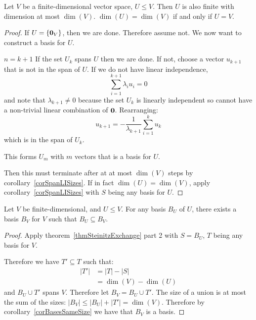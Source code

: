\documentclass[../Main.tex]{subfiles}
\begin{document}
\begin{corollary}
    Let $V$ be a finite-dimensional vector space, $U \leq V$. Then $U$ is also finite with dimension at most $\dim(V)$. $\dim(U) = \dim(V)$ if and only if $U = V$.
    \label{corSubspaceDim}
\end{corollary}
\begin{proof}
    If $U = \{\boldsymbol{0}_V\}$, then we are done. Therefore assume not. We now want to construct a basis for $U$.

    {$n = k + 1$}{
        If the set $U_k$ spans $U$ then we are done. If not, choose a vector $u_{k+1}$ that is not in the span of $U$. If we do not have linear independence,
        \begin{equation*}
            \sum_{i = 1}^{k+1} \lambda_iu_{i} = 0
        \end{equation*}
        and note that $\lambda_{k+1} \neq 0$ because the set $U_k$ is linearly independent so cannot have a non-trivial linear combination of $\boldsymbol{0}$.
        Rearranging:
        \begin{equation*}
            u_{k + 1} = -\frac{1}{\lambda_{k+1}} \sum_{i=1}^{k} u_k
        \end{equation*}
        which is in the span of $U_k$.~\contradiction
    }

    This forms $U_m$ with $m$ vectors that is a basis for $U$.

    Then this must terminate after at at most $\dim(V)$ steps by corollary~\ref{corSpanLISizes}. If in fact $\dim(U) = \dim(V)$, apply corollary~\ref{corSpanLISizes} with $S$ being any basis for $U$.
\end{proof}
\begin{proposition}
    Let $V$ be finite-dimensional, and $U \leq V$. For any basis $B_U$ of $U$, there exists a basis $B_V$ for $V$ such that $B_U \subseteq B_V$.
    \label{propBasisExtension}
\end{proposition}
\begin{proof}
    Apply theorem~\ref{thmSteinitzExchange} part 2 with $S = B_U$, $T$ being any basis for $V$.

    Therefore we have $T' \subseteq T$ such that:
    \begin{align*}
        |T'| &= |T| - |S| \\
        &= \dim(V) - \dim(U)
    \end{align*}
    and $B_U \cup T'$ spans $V$. Therefore let $B_V = B_U \cup T'$. The size of a union is at most the sum of the sizes: $|B_V| \leq |B_U| + |T'| = \dim(V)$. Therefore by corollary~\ref{corBasesSameSize} we have that $B_V$ is a basis.
\end{proof}
\end{document}
